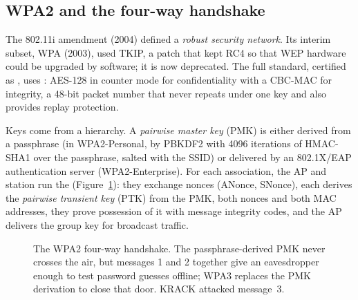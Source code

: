 \subsection{WPA2 and the four-way handshake}

The 802.11i amendment (2004) defined a \emph{robust security network}. Its interim subset, WPA (2003),
used TKIP, a patch that kept RC4 so that WEP hardware could be upgraded by software; it is now
deprecated. The full standard, certified as , uses : AES-128 in counter mode for
confidentiality with a CBC-MAC for integrity, a 48-bit packet number that never repeats under one key
and also provides replay protection.

Keys come from a hierarchy. A \emph{pairwise master key} (PMK) is either derived from a passphrase
(in WPA2-Personal, by PBKDF2 with 4096 iterations of HMAC-SHA1 over the passphrase, salted with the
SSID) or delivered by an 802.1X/EAP authentication server (WPA2-Enterprise). For each association, the
AP and station run the  (Figure~\ref{fig:ch22_handshake}): they exchange
nonces (ANonce, SNonce), each derives the \emph{pairwise transient key} (PTK) from the PMK, both
nonces and both MAC addresses, they prove possession of it with message integrity codes, and the AP
delivers the group key for broadcast traffic.

\begin{figure}[htbp]\centering
{}
\caption{The WPA2 four-way handshake. The passphrase-derived PMK never crosses the air, but messages
1 and 2 together give an eavesdropper enough to test password guesses offline; WPA3 replaces the
PMK derivation to close that door. KRACK attacked message~3.}
\label{fig:ch22_handshake}
\end{figure}

